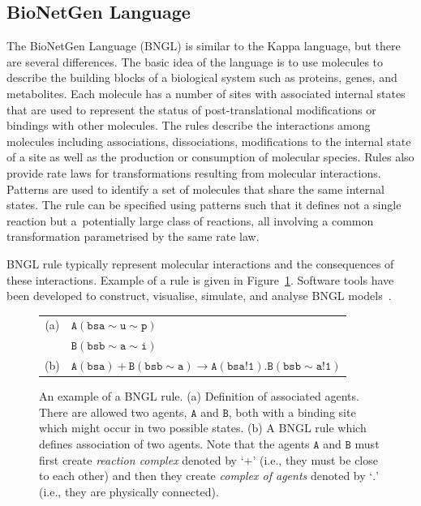 \documentclass[11pt,a4paper]{report}
\begin{document}
\subsection{BioNetGen Language}
\label{bngl}

The BioNetGen Language (BNGL) \cite{harris2016bionetgen} is similar to the Kappa language, but there are several differences. The basic idea of the language is to use molecules to describe the building blocks of a biological system such as proteins, genes, and metabolites. Each molecule has a number of sites with associated internal states that are used to represent the status of post-translational modifications or bindings with other molecules. The rules describe the interactions among molecules including associa­tions, dissociations, modifications to the internal state of a site as well as the production or consumption of molecular species. Rules also provide rate laws for transformations resulting from molecular interactions. Patterns are used to identify a set of molecules that share the same internal states. The rule can be specified using patterns such that it defines not a single reaction but a~potentially large class of reactions, all involving a common transformation parametrised by the same rate law.

BNGL rule typically represent molecular interactions and the consequences of these interactions. Example of a rule is given in Figure~\ref{bngl-rule}. Software tools have been developed to construct, visualise, simulate, and analyse BNGL models~\cite{harris2016bionetgen,sneddon2011efficient,wenskovitch2014mosbie,xu2011rulebender}.

\begin{figure}[!h]
\begin{center}
\begin{tabular}{c l}
(a) & $\mathtt{A(bsa\sim u \sim p)}$ \\
  & $\mathtt{B(bsb \sim a \sim i)}$ \\
(b) & $\mathtt{A(bsa) + B(bsb \sim a) \rightarrow A(bsa!1).B(bsb \sim a!1)}$ \\
\end{tabular}
\end{center}
\caption{An example of a BNGL rule. (a) Definition of associated agents. There are allowed two agents, $\mathtt{A}$ and $\mathtt{B}$, both with a binding site which might occur in two possible states. (b) A BNGL rule which defines association of two agents. Note that the agents $\mathtt{A}$ and $\mathtt{B}$ must first create \emph{reaction complex} denoted by `$\mathtt{+}$' (i.e., they must be close to each other) and then they create \emph{complex of agents} denoted by `$\mathtt{.}$' (i.e., they are physically connected).}\label{bngl-rule}
\end{figure}
\end{document}
